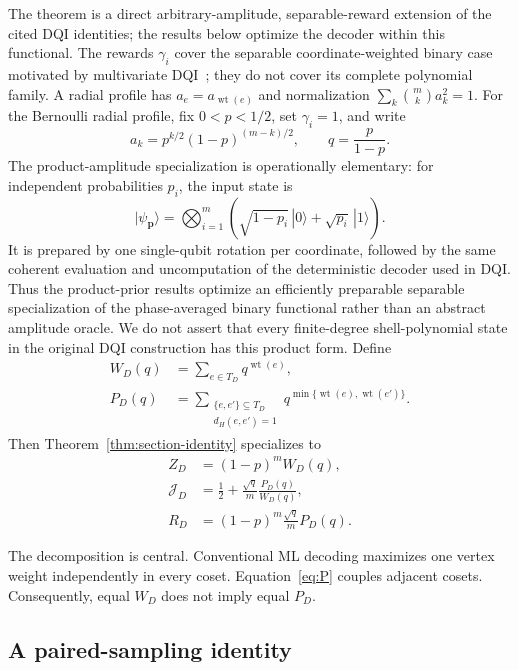 \documentclass[journal]{IEEEtran}
\theoremstyle{definition}
\theoremstyle{remark}
\newcommand{\wt}{\operatorname{wt}}
\begin{document}
The theorem is a direct arbitrary-amplitude, separable-reward extension of
the cited DQI identities; the results below optimize the decoder within this
functional.  The rewards $\gamma_i$ cover the separable coordinate-weighted
binary case motivated by multivariate DQI~\cite{bu2026}; they do not cover its
complete polynomial family.  A radial profile has
$a_e=a_{\wt(e)}$ and normalization
$\sum_k\binom{m}{k}a_k^2=1$.  For the Bernoulli radial profile, fix
$0<p<1/2$, set $\gamma_i=1$, and write
\begin{equation}
 a_k=p^{k/2}(1-p)^{(m-k)/2},\qquad q=\frac{p}{1-p}.
 \label{eq:prior}
\end{equation}
The product-amplitude specialization is operationally elementary: for
independent probabilities $p_i$, the input state is
\begin{equation}
 |\psi_{\boldsymbol p}\rangle
 =\bigotimes_{i=1}^m
 \left(\sqrt{1-p_i}\,|0\rangle+\sqrt{p_i}\,|1\rangle\right).
 \label{eq:product-state}
\end{equation}
It is prepared by one single-qubit rotation per coordinate, followed by the
same coherent evaluation and uncomputation of the deterministic decoder used
in DQI.  Thus the product-prior results optimize an efficiently preparable
separable specialization of the phase-averaged binary functional rather than
an abstract amplitude oracle.  We do not assert that every finite-degree
shell-polynomial state in the original DQI construction has this product
form.
Define
\begin{align}
 W_D(q)&=\sum_{e\in T_D}q^{\wt(e)},
 \label{eq:W}\\
 P_D(q)&=\sum_{\substack{\{e,e'\}\subseteq T_D\\d_H(e,e')=1}}
 q^{\min\{\wt(e),\wt(e')\}}.
 \label{eq:P}
\end{align}
Then Theorem~\ref{thm:section-identity} specializes to
\begin{align}
 Z_D&=(1-p)^mW_D(q),
 \label{eq:Z}\\
 \mathcal J_D&=\frac12+\frac{\sqrt q}{m}\frac{P_D(q)}{W_D(q)},
 \label{eq:J}\\
 R_D&=(1-p)^m\frac{\sqrt q}{m}P_D(q).
 \label{eq:R}
\end{align}

The decomposition is central.  Conventional ML decoding maximizes one vertex
weight independently in every coset.  Equation~\eqref{eq:P} couples adjacent
cosets.  Consequently, equal $W_D$ does not imply equal $P_D$.

\subsection{A paired-sampling identity}
\end{document}
